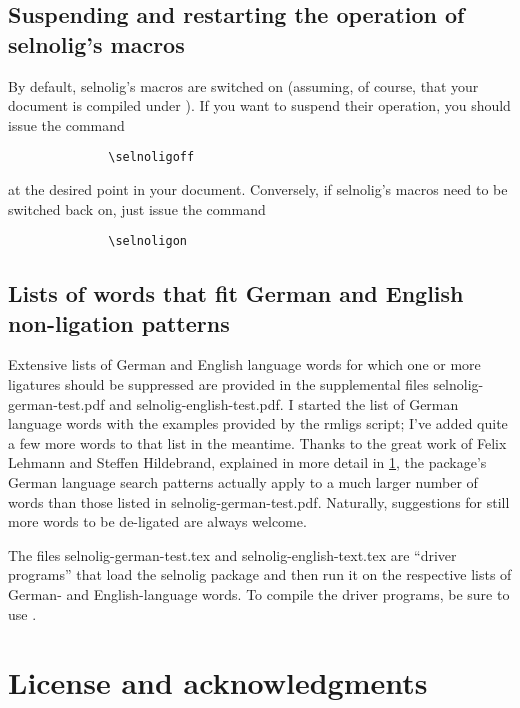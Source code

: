 \documentclass[11pt]{article}
\newcommand{\pkg}[1]{\textsf{#1}}
\begin{document}
\subsection[Suspending and restarting the operation of selnolig's macros]{Suspending and restarting the operation of \pkg{selnolig}'s macros}

By default, \pkg{selnolig}'s macros are switched on (assuming, of course, that your document is compiled under \LuaLaTeX). If you want to suspend their operation, you should issue the command
\begin{Verbatim}
              \selnoligoff
\end{Verbatim}
at the desired point in your document. Conversely, if \pkg{selnolig}'s macros need to be switched back on, just issue the command
\begin{Verbatim}
              \selnoligon
\end{Verbatim}


\subsection{Lists of words that fit German and English non-ligation patterns}

Extensive lists of German and English language words for which one or more ligatures should be suppressed are provided in the supplemental files \pkg{selnolig-german-test.pdf} and \pkg{selnolig-english-test.pdf}. I started the list of German language words with the examples provided by the \pkg{rmligs} script; I've added quite a few more words to that list in the meantime. Thanks to the great work of Felix Lehmann and Steffen Hildebrand, explained in more detail in \cref{sec:thanks}, the package's German language search patterns actually apply to a much larger number of words than those listed in \pkg{selnolig-german-test.pdf}. Naturally, suggestions for still more words to be de-ligated are always welcome.

The files \pkg{selnolig-german-test.tex} and \pkg{selnolig-english-text.tex} are \enquote{driver programs} that load the \pkg{selnolig} package and then run it on the respective lists of German- and English-language words. To compile the driver programs, be sure to use \LuaLaTeX.

\section{License and acknowledgments} \label{sec:thanks}
\end{document}
